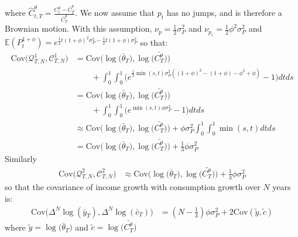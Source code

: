 where $\hat{C}^{\theta}_{t,T} = \frac{C^{\theta}_t-\bar{C}^{\theta}_T}{\bar{C}^{\theta}_T}$. We now assume that $p_t$ has no jumps, and is therefore a Brownian motion. With this assumption, $\nu_p = \frac{1}{2}\sigma^2_P$ and $\nu_{p_c}= \frac{1}{2}\phi^2\sigma^2_P$ and $\mathbb{E}(P^{1+\phi}_t) = e^{\frac{1}{2}t(1+\phi)^2\sigma^2_P - \frac{1}{2}t(1+\phi)\sigma^2_P}$ so that:
\begin{align*}
\mathrm{Cov}\Big(\mathcal{Q}^1_{T,N},\mathcal{C}^1_{T,N} \Big) 
&= \mathrm{Cov}\Big( \log \Big( \bar{\theta}_T \Big), \log \Big( \bar{C^{\theta}_T} \Big) \Big) \\
& \qquad +  \int_{0}^{1} \int_{0}^{1} \Big(e^{\frac{1}{2}\min(s,t)\sigma^2_P((1+\phi)^2 -(1+\phi) - \phi^2 +\phi  )}-1\Big) dt ds \\
&= \mathrm{Cov}\Big( \log \Big( \bar{\theta}_T \Big), \log \Big( \bar{C^{\theta}_T} \Big) \Big) \\
& \qquad +  \int_{0}^{1} \int_{0}^{1} \Big(e^{\min(s,t)\phi\sigma^2_P}-1\Big) dt ds \\
&\approx \mathrm{Cov}\Big( \log \Big( \bar{\theta}_T \Big), \log \Big( \bar{C^{\theta}_T} \Big) \Big)  +  \phi\sigma^2_P \int_{0}^{1} \int_{0}^{1} \min(s,t)dt ds \\
&=\mathrm{Cov}\Big( \log \Big( \bar{\theta}_T \Big), \log \Big( \bar{C^{\theta}_T} \Big) \Big)  +  \frac{1}{3}\phi\sigma^2_P 
\end{align*}
Similarly
\begin{align*}
\mathrm{Cov}\Big(\mathcal{Q}^2_{T,N},\mathcal{C}^2_{T,N} \Big) 
&\approx \mathrm{Cov}\Big( \log \Big( \bar{\theta}_T \Big), \log \Big( \bar{C^{\theta}_T} \Big) \Big)  +  \frac{1}{3}\phi\sigma^2_P 
\end{align*}
so that the covariance of income growth with consumption growth over $N$ years is:
\begin{align*}
\mathrm{Cov}\Big(\Delta^N\log(\bar{y}_T), \Delta^N\log(\bar{c}_T)\Big) 
&= (N-\frac{1}{3})\phi \sigma^2_P + 2 \mathrm{Cov}(\tilde{y},\tilde{c})
\end{align*}
where $\tilde{y} = \log \Big( \bar{\theta}_T \Big)$ and $\tilde{c} =\log \Big( \bar{C^{\theta}_T} \Big) $

